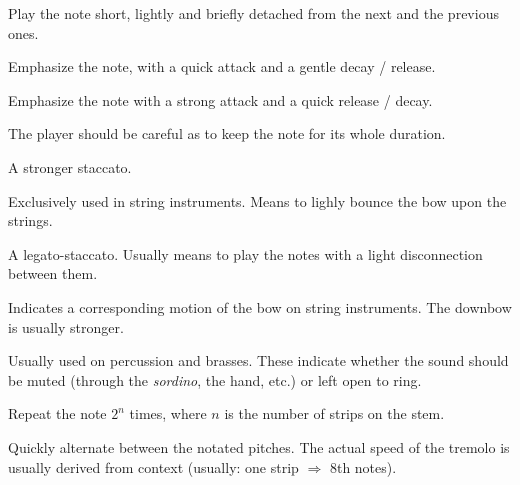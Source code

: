 \begin{definition}[Staccato]
    Play the note short, lightly and briefly detached from the next and the previous ones.
\end{definition}

\begin{definition}[Accent]
    Emphasize the note, with a quick attack and a gentle decay / release.
\end{definition}

\begin{definition}[Marcato]
    Emphasize the note with a strong attack and a quick release / decay.
\end{definition}

\begin{definition}[Tenuto]
    The player should be careful as to keep the note for its whole duration.
\end{definition}

\begin{definition}[Staccatissimo]
    A stronger staccato.
\end{definition}

\begin{definition}[Spiccato]
    Exclusively used in string instruments. Means to lighly bounce the bow upon the strings.
\end{definition}

\begin{definition}[Portato]
    A legato-staccato. Usually means to play the notes with a light disconnection between them.
\end{definition}

\begin{definition}
    Indicates a corresponding motion of the bow on string instruments. The downbow is usually stronger.
\end{definition}

\begin{definition}
    Usually used on percussion and brasses. These indicate whether the sound should be muted (through the \emph{sordino}, the hand, etc.) or left open to ring.
\end{definition}

\begin{definition}
    Repeat the note $2^n$ times, where $n$ is the number of strips on the stem.
\end{definition}

\begin{definition}
    Quickly alternate between the notated pitches. The actual speed of the tremolo is usually derived from context (usually: one strip $\Rightarrow$ 8th notes).
\end{definition}

